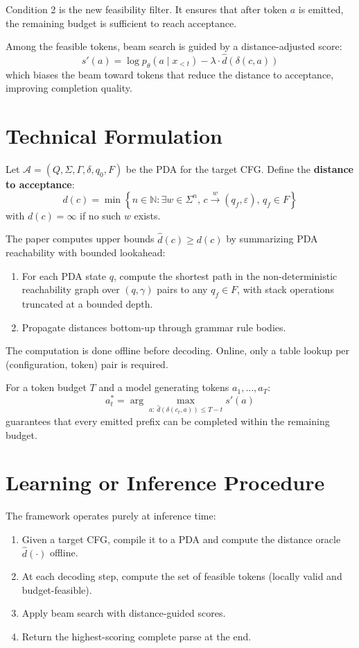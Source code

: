 \documentclass[10pt,twocolumn]{article}
\begin{document}
Condition 2 is the new feasibility filter. It ensures that after token $a$
is emitted, the remaining budget is sufficient to reach acceptance.

Among the feasible tokens, beam search is guided by a distance-adjusted
score:
\[
  s'(a) = \log p_\theta(a \mid x_{<t}) - \lambda \cdot \hat{d}(\delta(c, a))
\]
which biases the beam toward tokens that reduce the distance to acceptance,
improving completion quality.

\section{Technical Formulation}

Let $\mathcal{A} = (Q, \Sigma, \Gamma, \delta, q_0, F)$ be the PDA for
the target CFG. Define the \textbf{distance to acceptance}:
\[
  d(c) = \min\!\left\{n \in \mathbb{N} : \exists w \in \Sigma^n,\,
    c \xrightarrow{w} (q_f, \varepsilon),\, q_f \in F\right\}
\]
with $d(c) = \infty$ if no such $w$ exists.

The paper computes upper bounds $\hat{d}(c) \geq d(c)$ by summarizing
PDA reachability with bounded lookahead:
\begin{enumerate}[itemsep=2pt,parsep=0pt]
  \item For each PDA state $q$, compute the shortest path in the
    non-deterministic reachability graph over $(q, \gamma)$ pairs to
    any $q_f \in F$, with stack operations truncated at a bounded depth.
  \item Propagate distances bottom-up through grammar rule bodies.
\end{enumerate}
The computation is done offline before decoding. Online, only a table
lookup per (configuration, token) pair is required.

For a token budget $T$ and a model generating tokens $a_1, \ldots, a_T$:
\[
  a_t^* = \arg\max_{a:\, \hat{d}(\delta(c_t, a)) \leq T - t}
           s'(a)
\]
guarantees that every emitted prefix can be completed within the remaining
budget.

\section{Learning or Inference Procedure}

The framework operates purely at inference time:
\begin{enumerate}[itemsep=2pt,parsep=0pt]
  \item Given a target CFG, compile it to a PDA and compute the distance
    oracle $\hat{d}(\cdot)$ offline.
  \item At each decoding step, compute the set of feasible tokens
    (locally valid and budget-feasible).
  \item Apply beam search with distance-guided scores.
  \item Return the highest-scoring complete parse at the end.
\end{enumerate}
\end{document}
